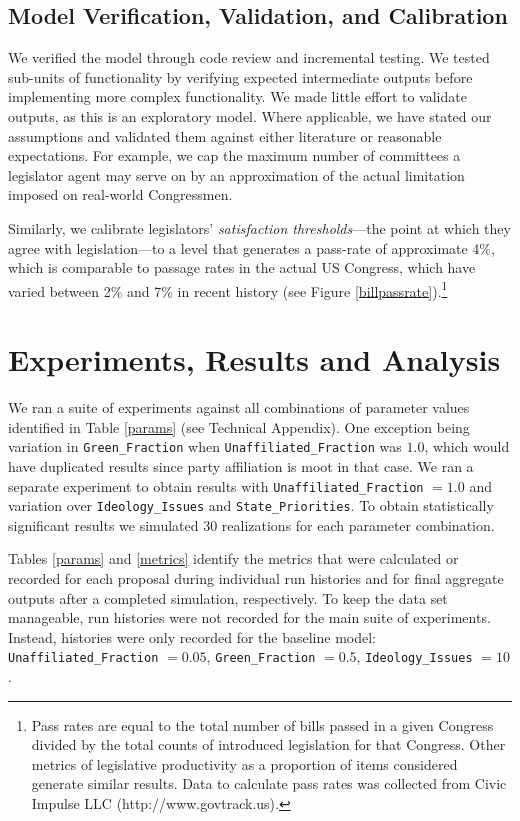 \documentclass[pdftex,12pt]{llncs}
\begin{document}
\subsection{Model Verification, Validation, and Calibration}
We verified the model through code review and incremental testing.
We tested sub-units of functionality by verifying expected intermediate outputs before implementing more complex functionality.
We made little effort to validate outputs, as this is an exploratory model.  
Where applicable, we have stated our assumptions and validated them against either literature or reasonable expectations.  
For example, we cap the maximum number of committees a legislator agent may serve on by an approximation of the actual limitation imposed on real-world Congressmen.

Similarly, we calibrate legislators' \textit{satisfaction thresholds}---the point at which they agree with legislation---to a level that generates a pass-rate of approximate 4\%, which is comparable to passage rates in the actual US Congress, which have varied between 2\% and 7\% in recent history (see Figure \ref{billpassrate}).\footnote{Pass rates are equal to the total number of bills passed in a given Congress divided by the total counts of introduced legislation for that Congress. Other metrics of legislative productivity as a proportion of items considered generate similar results. Data to calculate pass rates was collected from Civic Impulse LLC (http://www.govtrack.us).\label{passfn}}


\section{Experiments, Results and Analysis}

We ran a suite of experiments against all combinations of parameter values identified in Table \ref{params} (see Technical Appendix).  
One exception being variation in \texttt{Green\_Fraction} when \texttt{Unaffiliated\_Fraction} was $1.0$, which would have duplicated results since party affiliation is moot in that case.
We ran a separate experiment to obtain results with \texttt{Unaffiliated\_Fraction} $= 1.0$ and variation over \texttt{Ideology\_Issues} and \texttt{State\_Priorities}.  
To obtain statistically significant results we simulated 30 realizations for each parameter combination.

Tables \ref{params} and \ref{metrics} identify the metrics that were calculated or recorded for each proposal during individual run histories and for final aggregate outputs after a completed simulation, respectively.  
To keep the data set manageable, run histories were not recorded for the main suite of experiments.  
Instead, histories were only recorded for the baseline model:  \texttt{Unaffiliated\_Fraction} $= 0.05$, \texttt{Green\_Fraction} $= 0.5$, \texttt{Ideology\_Issues} $= 10$.
\end{document}

